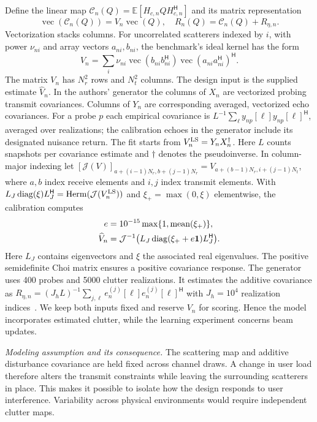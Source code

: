 \documentclass[journal]{IEEEtran}
\DeclareMathOperator{\diag}{diag}
\DeclareMathOperator{\vecop}{vec}
\DeclareMathOperator{\Herm}{Herm}
\newcommand{\Hh}{^{\mathsf H}}
\newcommand{\E}{\mathbb E}
\begin{document}
Define the linear map $\mathcal C_n(Q)=\E[H_{c,n}QH_{c,n}\Hh]$ and its matrix representation
\begin{equation}
 \vecop(\mathcal C_n(Q))=V_n\vecop(Q),\quad
 R_n(Q)=\mathcal C_n(Q)+R_{\eta,n}.
 \label{eq:map}
\end{equation}
Vectorization stacks columns. For uncorrelated scatterers indexed by $i$, with power $\nu_{ni}$ and array vectors $a_{ni},b_{ni}$, the benchmark's ideal kernel has the form
\begin{equation}
 V_n=\sum_i \nu_{ni}\vecop(b_{ni}b_{ni}\Hh)
                         \vecop(a_{ni}a_{ni}\Hh)\Hh .
\end{equation}
The matrix $V_n$ has $N_r^2$ rows and $N_t^2$ columns. The design input is the supplied estimate $\widehat V_n$. In the authors' generator the columns of $X_n$ are vectorized probing transmit covariances. Columns of $Y_n$ are corresponding averaged, vectorized echo covariances. For a probe $p$ each empirical covariance is $L^{-1}\sum_{\ell} y_{np}[\ell]y_{np}[\ell]\Hh$, averaged over realizations; the calibration echoes in the generator include its designated nuisance return. The fit starts from $V_n^{\rm LS}=Y_nX_n^\dagger$. Here $L$ counts snapshots per covariance estimate and $\dagger$ denotes the pseudoinverse. In column-major indexing let $[\mathcal J(V)]_{a+(i-1)N_r,b+(j-1)N_r}=V_{a+(b-1)N_r,i+(j-1)N_t}$, where $a,b$ index receive elements and $i,j$ index transmit elements. With $L_J\diag(\xi)L_J\Hh=\Herm(\mathcal J(V_n^{\rm LS}))$ and $\xi_+=\max(0,\xi)$ elementwise, the calibration computes
\begin{align}
 e&=10^{-15}\max\{1,\mathrm{mean}(\xi_+)\},\\
 \widehat V_n&=\mathcal J^{-1}\bigl(L_J\diag(\xi_++e{\bf1})L_J\Hh\bigr).
\end{align}
 Here $L_J$ contains eigenvectors and $\xi$ the associated real eigenvalues. The positive semidefinite Choi matrix ensures a positive covariance response. The generator uses 400 probes and 5000 clutter realizations. It estimates the additive covariance as $R_{\eta,n}=(J_hL)^{-1}\sum_{j,\ell}e_n^{(j)}[\ell]e_n^{(j)}[\ell]\Hh$ with $J_h=10^4$ realization indices~\cite{liuCode}. We keep both inputs fixed and reserve $V_n$ for scoring. Hence the model incorporates estimated clutter, while the learning experiment concerns beam updates.

\emph{Modeling assumption and its consequence.} The scattering map and additive disturbance covariance are held fixed across channel draws. A change in user load therefore alters the transmit constraints while leaving the surrounding scatterers in place. This makes it possible to isolate how the design responds to user interference. Variability across physical environments would require independent clutter maps.
\end{document}
